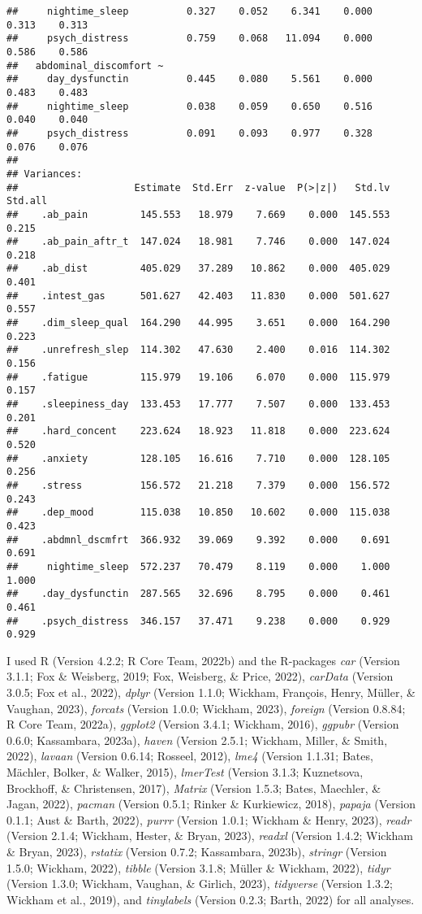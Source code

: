 \documentclass[
  man]{apa6}
\begin{document}
\begin{verbatim}
##     nightime_sleep          0.327    0.052    6.341    0.000    0.313    0.313
##     psych_distress          0.759    0.068   11.094    0.000    0.586    0.586
##   abdominal_discomfort ~                                                      
##     day_dysfunctin          0.445    0.080    5.561    0.000    0.483    0.483
##     nightime_sleep          0.038    0.059    0.650    0.516    0.040    0.040
##     psych_distress          0.091    0.093    0.977    0.328    0.076    0.076
## 
## Variances:
##                    Estimate  Std.Err  z-value  P(>|z|)   Std.lv  Std.all
##    .ab_pain         145.553   18.979    7.669    0.000  145.553    0.215
##    .ab_pain_aftr_t  147.024   18.981    7.746    0.000  147.024    0.218
##    .ab_dist         405.029   37.289   10.862    0.000  405.029    0.401
##    .intest_gas      501.627   42.403   11.830    0.000  501.627    0.557
##    .dim_sleep_qual  164.290   44.995    3.651    0.000  164.290    0.223
##    .unrefresh_slep  114.302   47.630    2.400    0.016  114.302    0.156
##    .fatigue         115.979   19.106    6.070    0.000  115.979    0.157
##    .sleepiness_day  133.453   17.777    7.507    0.000  133.453    0.201
##    .hard_concent    223.624   18.923   11.818    0.000  223.624    0.520
##    .anxiety         128.105   16.616    7.710    0.000  128.105    0.256
##    .stress          156.572   21.218    7.379    0.000  156.572    0.243
##    .dep_mood        115.038   10.850   10.602    0.000  115.038    0.423
##    .abdmnl_dscmfrt  366.932   39.069    9.392    0.000    0.691    0.691
##     nightime_sleep  572.237   70.479    8.119    0.000    1.000    1.000
##    .day_dysfunctin  287.565   32.696    8.795    0.000    0.461    0.461
##    .psych_distress  346.157   37.471    9.238    0.000    0.929    0.929
\end{verbatim}

I used R (Version 4.2.2; R Core Team, 2022b) and the R-packages \emph{car} (Version 3.1.1; Fox \& Weisberg, 2019; Fox, Weisberg, \& Price, 2022), \emph{carData} (Version 3.0.5; Fox et al., 2022), \emph{dplyr} (Version 1.1.0; Wickham, François, Henry, Müller, \& Vaughan, 2023), \emph{forcats} (Version 1.0.0; Wickham, 2023), \emph{foreign} (Version 0.8.84; R Core Team, 2022a), \emph{ggplot2} (Version 3.4.1; Wickham, 2016), \emph{ggpubr} (Version 0.6.0; Kassambara, 2023a), \emph{haven} (Version 2.5.1; Wickham, Miller, \& Smith, 2022), \emph{lavaan} (Version 0.6.14; Rosseel, 2012), \emph{lme4} (Version 1.1.31; Bates, Mächler, Bolker, \& Walker, 2015), \emph{lmerTest} (Version 3.1.3; Kuznetsova, Brockhoff, \& Christensen, 2017), \emph{Matrix} (Version 1.5.3; Bates, Maechler, \& Jagan, 2022), \emph{pacman} (Version 0.5.1; Rinker \& Kurkiewicz, 2018), \emph{papaja} (Version 0.1.1; Aust \& Barth, 2022), \emph{purrr} (Version 1.0.1; Wickham \& Henry, 2023), \emph{readr} (Version 2.1.4; Wickham, Hester, \& Bryan, 2023), \emph{readxl} (Version 1.4.2; Wickham \& Bryan, 2023), \emph{rstatix} (Version 0.7.2; Kassambara, 2023b), \emph{stringr} (Version 1.5.0; Wickham, 2022), \emph{tibble} (Version 3.1.8; Müller \& Wickham, 2022), \emph{tidyr} (Version 1.3.0; Wickham, Vaughan, \& Girlich, 2023), \emph{tidyverse} (Version 1.3.2; Wickham et al., 2019), and \emph{tinylabels} (Version 0.2.3; Barth, 2022) for all analyses.
\end{document}
